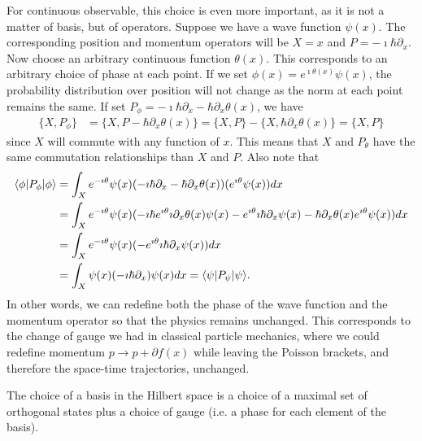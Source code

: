 For continuous observable, this choice is even more important, as it is not a matter of basis, but of operators. Suppose we have a wave function $\psi(x)$. The corresponding position and momentum operators will be $X=x$ and $P=-\imath \hbar \partial_x$. Now choose an arbitrary continuous function $\theta(x)$. This corresponds to an arbitrary choice of phase at each point. If we set $\phi(x) = e^{\imath \theta(x)} \psi(x)$, the probability distribution over position will not change as the norm at each point remains the same. If set $P_{\phi} = -\imath \hbar \partial_x - \hbar \partial_x \theta(x)$, we have
\begin{equation}
	\begin{aligned}
		\{X, P_{\phi}\} &= \{X, P - \hbar \partial_x \theta(x)\} = \{X, P \} - \{X, \hbar \partial_x \theta(x)\} = \{X, P \}
	\end{aligned}
\end{equation}
since $X$ will commute with any function of $x$. This means that $X$ and $P_{\theta}$ have the same commutation relationships than $X$ and $P$. Also note that
\begin{equation}
	\begin{aligned}
		\langle\phi | P_{\phi} | \phi \rangle & = \int_X e^{ - \imath \theta} \psi(x) (-\imath \hbar \partial_x - \hbar \partial_x  \theta(x) )(e^{ \imath \theta} \psi(x)) dx \\
		& = \int_X e^{ - \imath \theta} \psi(x) (-\imath \hbar e^{ \imath \theta} \imath \partial_x \theta(x)  \psi(x) - e^{ \imath \theta} \imath \hbar \partial_x\psi(x)  - \hbar \partial_x  \theta(x) e^{ \imath \theta} \psi(x)) dx \\
		& = \int_X e^{ - \imath \theta} \psi(x) (- e^{ \imath \theta} \imath \hbar \partial_x\psi(x) ) dx \\
		& = \int_X \psi(x) (- \imath \hbar \partial_x )\psi(x)  dx  = \langle\psi | P_{\psi} | \psi \rangle.
	\end{aligned}
\end{equation}
In other words, we can redefine both the phase of the wave function and the momentum operator so that the physics remains unchanged. This corresponds to the change of gauge we had in classical particle mechanics, where we could redefine momentum $p \to p + \partial f(x)$ while leaving the Poisson brackets, and therefore the space-time trajectories, unchanged.

\begin{insight}
	The choice of a basis in the Hilbert space is a choice of a maximal set of orthogonal states plus a choice of gauge (i.e. a phase for each element of the basis).
\end{insight}


